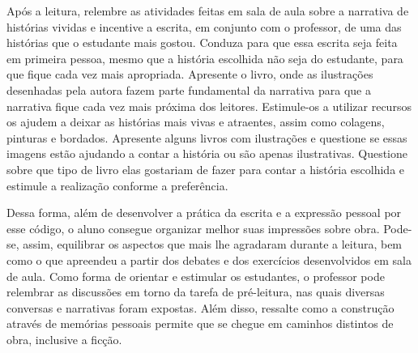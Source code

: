 \documentclass[11pt]{extarticle}
\begin{document}

Após a leitura, relembre as atividades feitas em sala de aula sobre a narrativa de histórias vividas e incentive a escrita, em conjunto com o professor, de uma das histórias que o estudante mais gostou. Conduza para que essa escrita seja feita em primeira pessoa, mesmo que a história escolhida não seja do estudante, para que fique cada vez mais apropriada. Apresente o livro, onde as ilustrações desenhadas pela autora fazem parte fundamental da narrativa para que a narrativa fique cada vez mais próxima dos leitores. Estimule-os a utilizar recursos os ajudem a deixar as histórias mais vivas e atraentes, assim como colagens, pinturas e bordados. Apresente alguns livros com ilustrações e questione se essas imagens estão ajudando a contar a história ou são apenas ilustrativas. Questione sobre que tipo de livro elas gostariam de fazer para contar a história escolhida e estimule a realização conforme a preferência. 


Dessa forma, além de desenvolver a prática da escrita e a expressão pessoal por esse código, o aluno consegue organizar melhor suas impressões sobre obra. Pode-se, assim, equilibrar os aspectos que mais lhe agradaram durante a leitura, bem como o que apreendeu a partir dos debates e dos exercícios desenvolvidos em sala de aula. Como forma de orientar e estimular os estudantes, o professor pode relembrar as discussões em torno da tarefa de pré-leitura, nas quais diversas conversas e narrativas foram expostas. Além disso, ressalte como a construção através de memórias pessoais permite que se chegue em caminhos distintos de obra, inclusive a ficção. 

\end{document}
